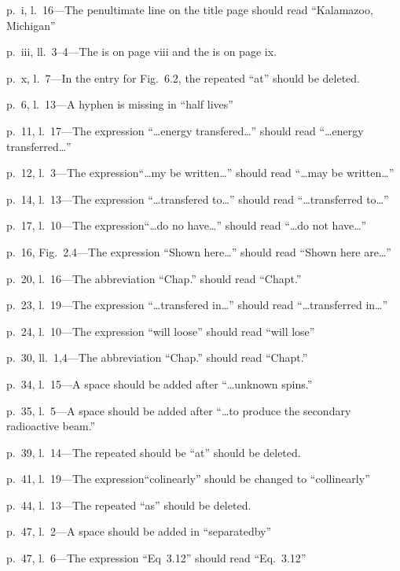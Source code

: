   \item p.~i, l.~16---The penultimate line on the title page should read ``Kalamazoo, Michigan''
  \item p.~iii, ll.~3--4---The \listtablename{} is on page viii and the \listfigurename{} is on page ix.
  \item p.~x, l.~7---In the entry for Fig.~6.2, the repeated ``at'' should be deleted. 
  \item p.~6, l.~13---A hyphen is missing in ``half lives''
  \item p.~11, l.~17---The expression ``\ldots energy transfered\ldots'' should read ``\ldots energy transferred\ldots'' 
  \item p.~12, l.~3---The expression``\ldots my be written\ldots'' should read ``\ldots may be written\ldots ''
  \item p.~14, l.~13---The expression ``\ldots transfered to\ldots'' should read ``\ldots transferred to\ldots'' 
  \item p.~17, l.~10---The expression``\ldots do no have\ldots'' should read ``\ldots do not have\ldots ''
  \item p.~16, Fig.~2.4---The expression ``Shown here\ldots'' should read ``Shown here are\ldots'' 
  \item p.~20, l.~16---The abbreviation ``Chap.'' should read ``Chapt.'' 
  \item p.~23, l.~19---The expression ``\ldots transfered in\ldots'' should read ``\ldots transferred in\ldots''	
  \item p.~24, l.~10---The expression ``will loose'' should read ``will lose''
  \item p.~30, ll.~1,4---The abbreviation ``Chap.'' should read ``Chapt.'' 
  \item p.~34, l.~15---A space should be added after ``\ldots unknown spins.'' 
  \item p.~35, l.~5---A space should be added after ``\ldots to produce the secondary radioactive beam.'' 
  \item p.~39, l.~14---The repeated should be ``at'' should be deleted. 
  \item p.~41, l.~19---The expression``colinearly'' should be changed to ``collinearly''
  \item p.~44, l.~13---The repeated ``as'' should be deleted.
  \item p.~47, l.~2---A space should be added in ``separatedby''
  \item p.~47, l.~6---The expression ``Eq~3.12'' should read ``Eq.~3.12''
